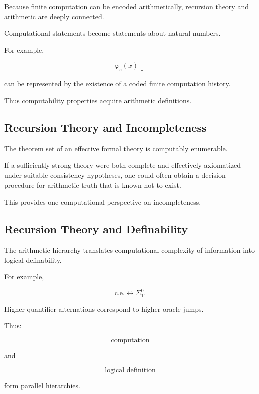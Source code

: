 Because finite computation can be encoded arithmetically, recursion theory
and arithmetic are deeply connected.

Computational statements become statements about natural numbers.

For example,

\[
\boxed{
\varphi_e(x)\downarrow
}
\]

can be represented by the existence of a coded finite computation history.

Thus computability properties acquire arithmetic definitions.

\subsection{Recursion Theory and Incompleteness}
\label{subsec:recursion-theory-incompleteness}

The theorem set of an effective formal theory is computably enumerable.

If a sufficiently strong theory were both complete and effectively
axiomatized under suitable consistency hypotheses, one could often obtain
a decision procedure for arithmetic truth that is known not to exist.

This provides one computational perspective on incompleteness.

\subsection{Recursion Theory and Definability}
\label{subsec:recursion-definability}

The arithmetic hierarchy translates computational complexity of
information into logical definability.

For example,

\[
\boxed{
\text{c.e.}
\leftrightarrow
\Sigma^0_1.
}
\]

Higher quantifier alternations correspond to higher oracle jumps.

Thus:

\[
\boxed{
\text{computation}
}
\]

and

\[
\boxed{
\text{logical definition}
}
\]

form parallel hierarchies.

